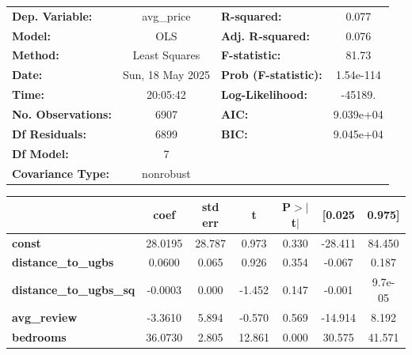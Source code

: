 \begin{center}
\begin{tabular}{lclc}
\toprule
\textbf{Dep. Variable:}         &    avg\_price    & \textbf{  R-squared:         } &       0.077    \\
\textbf{Model:}                 &       OLS        & \textbf{  Adj. R-squared:    } &       0.076    \\
\textbf{Method:}                &  Least Squares   & \textbf{  F-statistic:       } &       81.73    \\
\textbf{Date:}                  & Sun, 18 May 2025 & \textbf{  Prob (F-statistic):} &   1.54e-114    \\
\textbf{Time:}                  &     20:05:42     & \textbf{  Log-Likelihood:    } &     -45189.    \\
\textbf{No. Observations:}      &        6907      & \textbf{  AIC:               } &   9.039e+04    \\
\textbf{Df Residuals:}          &        6899      & \textbf{  BIC:               } &   9.045e+04    \\
\textbf{Df Model:}              &           7      & \textbf{                     } &                \\
\textbf{Covariance Type:}       &    nonrobust     & \textbf{                     } &                \\
\bottomrule
\end{tabular}
\begin{tabular}{lcccccc}
                                & \textbf{coef} & \textbf{std err} & \textbf{t} & \textbf{P$> |$t$|$} & \textbf{[0.025} & \textbf{0.975]}  \\
\midrule
\textbf{const}                  &      28.0195  &       28.787     &     0.973  &         0.330        &      -28.411    &       84.450     \\
\textbf{distance\_to\_ugbs}     &       0.0600  &        0.065     &     0.926  &         0.354        &       -0.067    &        0.187     \\
\textbf{distance\_to\_ugbs\_sq} &      -0.0003  &        0.000     &    -1.452  &         0.147        &       -0.001    &      9.7e-05     \\
\textbf{avg\_review}            &      -3.3610  &        5.894     &    -0.570  &         0.569        &      -14.914    &        8.192     \\
\textbf{bedrooms}               &      36.0730  &        2.805     &    12.861  &         0.000        &       30.575    &       41.571     \\

\end{tabular}
\end{center}
